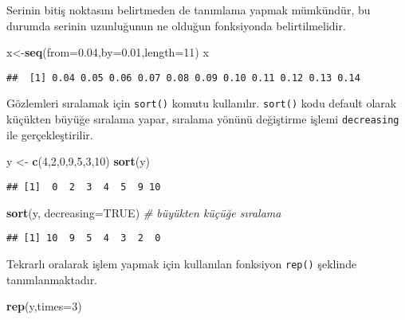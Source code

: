 \documentclass[
]{book}
\newenvironment{Shaded}{\begin{snugshade}}{\end{snugshade}}
\newcommand{\CommentTok}[1]{\textcolor[rgb]{0.56,0.35,0.01}{\textit{#1}}}
\newcommand{\DataTypeTok}[1]{\textcolor[rgb]{0.13,0.29,0.53}{#1}}
\newcommand{\DecValTok}[1]{\textcolor[rgb]{0.00,0.00,0.81}{#1}}
\newcommand{\FloatTok}[1]{\textcolor[rgb]{0.00,0.00,0.81}{#1}}
\newcommand{\KeywordTok}[1]{\textcolor[rgb]{0.13,0.29,0.53}{\textbf{#1}}}
\newcommand{\NormalTok}[1]{#1}
\newcommand{\OtherTok}[1]{\textcolor[rgb]{0.56,0.35,0.01}{#1}}
\newcommand{\StringTok}[1]{\textcolor[rgb]{0.31,0.60,0.02}{#1}}
\begin{document}
Serinin bitiş noktasını belirtmeden de tanımlama yapmak mümkündür, bu durumda serinin uzunluğunun ne olduğun fonksiyonda belirtilmelidir.

\begin{Shaded}
\begin{Highlighting}[]
\NormalTok{x<-}\KeywordTok{seq}\NormalTok{(}\DataTypeTok{from=}\FloatTok{0.04}\NormalTok{,}\DataTypeTok{by=}\FloatTok{0.01}\NormalTok{,}\DataTypeTok{length=}\DecValTok{11}\NormalTok{)}
\NormalTok{x}
\end{Highlighting}
\end{Shaded}

\begin{verbatim}
##  [1] 0.04 0.05 0.06 0.07 0.08 0.09 0.10 0.11 0.12 0.13 0.14
\end{verbatim}

Gözlemleri sıralamak için \texttt{sort()} komutu kullanılır. \texttt{sort()} kodu default olarak küçükten büyüğe sıralama yapar, sıralama yönünü değiştirme işlemi \texttt{decreasing} ile gerçekleştirilir.

\begin{Shaded}
\begin{Highlighting}[]
\NormalTok{y <-}\StringTok{ }\KeywordTok{c}\NormalTok{(}\DecValTok{4}\NormalTok{,}\DecValTok{2}\NormalTok{,}\DecValTok{0}\NormalTok{,}\DecValTok{9}\NormalTok{,}\DecValTok{5}\NormalTok{,}\DecValTok{3}\NormalTok{,}\DecValTok{10}\NormalTok{)}
\KeywordTok{sort}\NormalTok{(y)}
\end{Highlighting}
\end{Shaded}

\begin{verbatim}
## [1]  0  2  3  4  5  9 10
\end{verbatim}

\begin{Shaded}
\begin{Highlighting}[]
\KeywordTok{sort}\NormalTok{(y, }\DataTypeTok{decreasing=}\OtherTok{TRUE}\NormalTok{)  }\CommentTok{# büyükten küçüğe sıralama}
\end{Highlighting}
\end{Shaded}

\begin{verbatim}
## [1] 10  9  5  4  3  2  0
\end{verbatim}

Tekrarlı oralarak işlem yapmak için kullanılan fonksiyon \texttt{rep()} şeklinde tanımlanmaktadır.

\begin{Shaded}
\begin{Highlighting}[]
\KeywordTok{rep}\NormalTok{(y,}\DataTypeTok{times=}\DecValTok{3}\NormalTok{)}
\end{Highlighting}
\end{Shaded}
\end{document}
